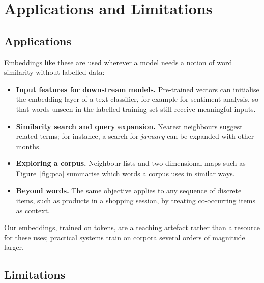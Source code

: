 \section{Applications and Limitations}
\label{sec:applications}

\subsection{Applications}

Embeddings like these are used wherever a model needs a notion of word similarity without labelled data:
\begin{itemize}
    \item \textbf{Input features for downstream models.} Pre-trained vectors can initialise the embedding layer of a text classifier, for example for sentiment analysis, so that words unseen in the labelled training set still receive meaningful inputs.
    \item \textbf{Similarity search and query expansion.} Nearest neighbours suggest related terms; for instance, a search for \textit{january} can be expanded with other months.
    \item \textbf{Exploring a corpus.} Neighbour lists and two-dimensional maps such as Figure~\ref{fig:pca} summarise which words a corpus uses in similar ways.
    \item \textbf{Beyond words.} The same objective applies to any sequence of discrete items, such as products in a shopping session, by treating co-occurring items as context.
\end{itemize}
Our embeddings, trained on \FinalTokens{} tokens, are a teaching artefact rather than a resource for these uses; practical systems train on corpora several orders of magnitude larger.

\subsection{Limitations}

